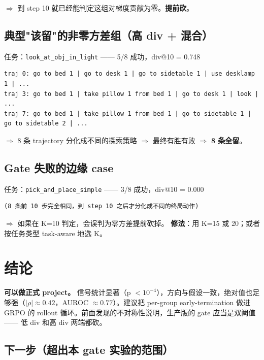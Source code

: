 \documentclass[11pt,a4paper]{article}
\begin{document}
$\Rightarrow$ 到 step 10 就已经能判定这组对梯度贡献为零。\textbf{提前砍}。

\subsection*{典型"该留"的非零方差组（高 div + 混合）}

任务：\texttt{look\_at\_obj\_in\_light} —— 5/8 成功，div@10 = 0.748

\begin{Verbatim}[fontsize=\small,frame=single,breaklines=true]
traj 0: go to bed 1 | go to desk 1 | go to sidetable 1 | use desklamp 1 | ...
traj 3: go to bed 1 | take pillow 1 from bed 1 | go to desk 1 | look | ...
traj 7: go to bed 1 | take pillow 1 from bed 1 | go to sidetable 1 | go to sidetable 2 | ...
\end{Verbatim}

$\Rightarrow$ 8 条 trajectory 分化成不同的探索策略 $\Rightarrow$ 最终有胜有败 $\Rightarrow$ \textbf{8 条全留}。

\subsection*{Gate 失败的边缘 case}

任务：\texttt{pick\_and\_place\_simple} —— 3/8 成功，div@10 = 0.000

\begin{Verbatim}[fontsize=\small,frame=single]
(8 条前 10 步完全相同，到 step 10 之后才分化成不同的终局动作)
\end{Verbatim}

$\Rightarrow$ 如果在 K=10 判定，会误判为零方差提前砍掉。
\textbf{修法}：用 K=15 或 20；或者按任务类型 task-aware 地选 K。

\section{结论}

\textbf{可以做正式 project。} 信号统计显著（p $< 10^{-4}$），方向与假设一致，绝对值也足够强（$|\rho| \approx 0.42$，AUROC $\approx 0.77$）。建议把 per-group early-termination 做进 GRPO 的 rollout 循环。前面发现的不对称性说明，生产版的 gate 应当是双阈值 —— 低 div 和高 div 两端都砍。

\subsection*{下一步（超出本 gate 实验的范围）}
\end{document}
